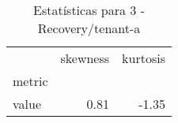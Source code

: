 \begin{table}[htbp]
\caption{Estatísticas para 3 - Recovery/tenant-a}
\label{tab:3_-_recovery_tenant-a_skewkurt}
\begin{tabular}{lrr}
\toprule
 & skewness & kurtosis \\
metric &  &  \\
\midrule
value & 0.81 & -1.35 \\
\bottomrule
\end{tabular}
\end{table}
